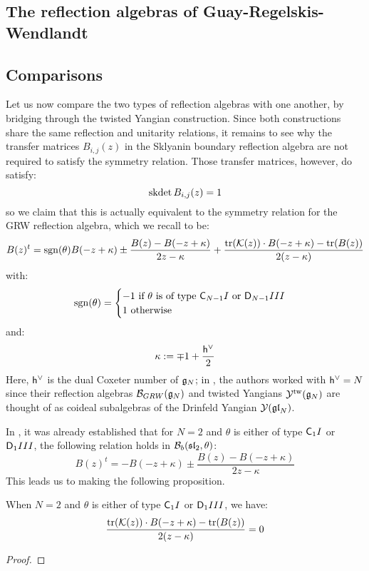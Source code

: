     \subsection{The reflection algebras of Guay-Regelskis-Wendlandt}

    \subsection{Comparisons}
        Let us now compare the two types of reflection algebras with one another, by bridging through the twisted Yangian construction. Since both constructions share the same reflection and unitarity relations, it remains to see why the transfer matrices $B_{i, j}(z)$ in the Sklyanin boundary reflection algebra are not required to satisfy the symmetry relation. Those transfer matrices, however, do satisfy:
            $$\operatorname{skdet} B_{i, j}(z) = 1$$
        so we claim that this is actually equivalent to the symmetry relation for the GRW reflection algebra, which we recall to be:
            \begin{equation} \label{equation: GRW_symmetry_relation}
                B(z)^t = \operatorname{sgn}(\theta) B(-z + \kappa) \pm \frac{B(z) - B(-z + \kappa)}{2z - \kappa} + \frac{\operatorname{tr}( \mathcal{K}(z) ) \cdot B(-z + \kappa) - \operatorname{tr}(B(z))}{2(z - \kappa)}
            \end{equation}
        with:
            $$
                \operatorname{sgn}(\theta) =
                \begin{cases}
                    \text{$-1$ if $\theta$ is of type $\mathsf{C}_{N - 1} I$ or $\mathsf{D}_{N - 1} III$}
                    \\
                    \text{$1$ otherwise}
                \end{cases}
            $$
        and:
            $$\kappa := \mp 1 + \frac{\mathsf{h}^{\vee}}{2}$$
        Here, $\mathsf{h}^{\vee}$ is the dual Coxeter number of $\mathfrak{g}_N$; in \cite{guay_regelskis_wendlandt_representations_of_twisted_yangians_for_symmetric_pairs_of_types_BCD_1}, the authors worked with $\mathsf{h}^{\vee} = N$ since their reflection algebras $\mathcal{B}_{GRW}(\mathfrak{g}_N)$ and twisted Yangians $\mathcal{Y}^{\mathrm{tw}}(\mathfrak{g}_N)$ are thought of as coideal subalgebras of the Drinfeld Yangian $\mathcal{Y}(\mathfrak{gl}_N)$.

        In \cite[Proposition 4.3]{molev_ragoucy_representations_of_reflection_algebras}, it was already established that for $N = 2$ and $\theta$ is either of type $\mathsf{C}_1 I$ or $\mathsf{D}_1 III$, the following relation holds in $\mathcal{B}_b(\mathfrak{sl}_2, \theta)$:
            $$B(z)^t = -B(-z + \kappa) \pm \frac{B(z) - B(-z + \kappa)}{2z - \kappa}$$
        This leads us to making the following proposition.
        \begin{proposition}
            When $N = 2$ and $\theta$ is either of type $\mathsf{C}_1 I$ or $\mathsf{D}_1 III$, we have:
                $$\frac{\operatorname{tr}( \mathcal{K}(z) ) \cdot B(-z + \kappa) - \operatorname{tr}(B(z))}{2(z - \kappa)} = 0$$
        \end{proposition}
            \begin{proof}
                
            \end{proof}